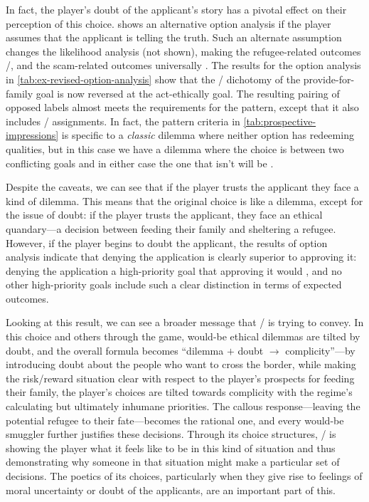 In fact, the player's doubt of the applicant's story has a pivotal effect on their perception of this choice.
%
 shows an alternative option analysis if the player assumes that the applicant is telling the truth.
%
Such an alternate assumption changes the likelihood analysis (not shown), making the refugee-related outcomes /, and the scam-related outcomes universally .
%
The results for the option analysis in \cref{tab:ex-revised-option-analysis} show that the / dichotomy of the provide-for-family goal is now reversed at the act-ethically goal.
%
The resulting pairing of opposed  labels almost meets the requirements for the  pattern, except that it also includes / assignments.
%
In fact, the  pattern criteria in \cref{tab:prospective-impressions} is specific to a \emph{classic} dilemma where neither option has redeeming qualities, but in this case we have a dilemma where the choice is between two conflicting goals and in either case the one that isn't  will be .


Despite the caveats, we can see that if the player trusts the applicant they face a kind of dilemma.
%
This means that the original choice is like a dilemma, except for the issue of doubt: if the player trusts the applicant, they face an ethical quandary---a decision between feeding their family and sheltering a refugee.
%
However, if the player begins to doubt the applicant, the results of option analysis indicate that denying the application is clearly superior to approving it: denying the application  a high-priority goal that approving it would , and no other high-priority goals include such a clear distinction in terms of expected outcomes.


Looking at this result, we can see a broader message that \papersplease/ is trying to convey.
%
In this choice and others through the game, would-be ethical dilemmas are tilted by doubt, and the overall formula becomes ``dilemma $+$ doubt $\rightarrow$ complicity''---by introducing doubt about the people who want to cross the border, while making the risk/reward situation clear with respect to the player's prospects for feeding their family, the player's choices are tilted towards complicity with the regime's calculating but ultimately inhumane priorities.
%
The callous response---leaving the potential refugee to their fate---becomes the rational one, and every would-be smuggler further justifies these decisions.
%
Through its choice structures, \papersplease/ is showing the player what it feels like to be in this kind of situation and thus demonstrating why someone in that situation might make a particular set of decisions.
%
The poetics of its choices, particularly when they give rise to feelings of moral uncertainty or doubt of the applicants, are an important part of this.


